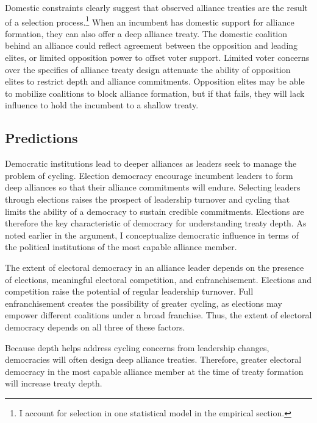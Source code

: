 \documentclass[12pt]{article}
\begin{document}
Domestic constraints clearly suggest that observed alliance treaties are the result of a selection process.\footnote{I account for selection in one statistical model in the empirical section.} 
When an incumbent has domestic support for alliance formation, they can also offer a deep alliance treaty. 
The domestic coalition behind an alliance could reflect agreement between the opposition and leading elites, or limited opposition power to offset voter support. 
Limited voter concerns over the specifics of alliance treaty design attenuate the ability of opposition elites to restrict depth and alliance commitments.
Opposition elites may be able to mobilize coalitions to block alliance formation, but if that fails, they will lack influence to hold the incumbent to a shallow treaty. 



\subsection{Predictions}

Democratic institutions lead to deeper alliances as leaders seek to manage the problem of cycling. 
Election democracy encourage incumbent leaders to form deep alliances so that their alliance commitments will endure.
Selecting leaders through elections raises the prospect of leadership turnover and cycling that limits the ability of a democracy to sustain credible commitments. 
Elections are therefore the key characteristic of democracy for understanding treaty depth. 
As noted earlier in the argument, I conceptualize democratic influence in terms of the political institutions of the most capable alliance member.


The extent of electoral democracy in an alliance leader depends on the presence of elections, meaningful electoral competition, and enfranchisement. 
Elections and competition raise the potential of regular leadership turnover. 
Full enfranchisement creates the possibility of greater cycling, as elections may empower different coalitions under a broad franchise. 
Thus, the extent of electoral democracy depends on all three of these factors. 


Because depth helps address cycling concerns from leadership changes, democracies will often design deep alliance treaties. 
Therefore, greater electoral democracy in the most capable alliance member at the time of treaty formation will increase treaty depth. 
\end{document}
